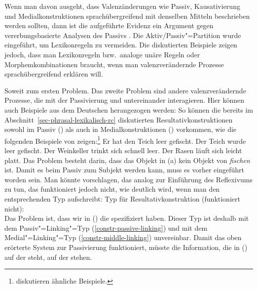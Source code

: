 Wenn man davon ausgeht, dass Valenzänderungen wie Passiv, Kausativierung und Medialkonstruktionen
sprachübergreifend mit denselben Mitteln beschrieben werden sollten, dann ist die aufgeführte
Evidenz ein Argument gegen vererbungsbasierte Analysen des Passivs
\citep{Mueller2006d,Mueller2007d}. Die Aktiv/Passiv"=Partition wurde eingeführt, um Lexikonregeln zu
vermeiden. Die diskutierten Beispiele zeigen jedoch, dass man Lexikonregeln bzw.\ analoge unäre
Regeln oder Morphemkombinationen braucht, wenn man valenzverändernde Prozesse sprachübergreifend
erklären will.

Soweit zum ersten Problem. Das zweite Problem sind andere valenzverändernde Prozesse,
die mit der Passivierung und untereinander interagieren. Hier können auch Beispiele aus dem Deutschen
herangezogen werden: So können \zb die bereits im Abschnitt~\ref{sec-phrasal-lexikalisch-rc} diskutierten
Resultativkonstruktionen sowohl im Passiv () als auch in Medialkonstruktionen ()
vorkommen, wie die folgenden Beispiele von \citet[]{Wunderlich97c} zeigen:\footnote{
        \citet[]{KR95a} diskutieren ähnliche Beispiele.%
}
\eal
\label{bsp-res-passiv-zwei}
\ex Er hat den Teich leer gefischt.
\ex Der Teich wurde leer gefischt.
\zl
\eal
\label{ex-res-nonselected-obj-passive}
\ex{}
Der Weinkeller  trinkt sich schnell leer.
\ex{}
Der Rasen läuft sich leicht platt.
\zl
Das Problem besteht darin, dass das Objekt in (a) kein Objekt von \emph{fischen} ist.
Damit es beim Passiv zum Subjekt werden kann, muss es vorher eingeführt worden sein. Man könnte
vorschlagen, das analog zur Einführung des Reflexivums zu tun, das funktioniert jedoch nicht,
wie deutlich wird, wenn man den entsprechenden Typ aufschreibt:
\ea
Typ für Resultativkonstruktion (funktioniert nicht):\\
\z
Das Problem ist, dass wir in () die \compsl spezifiziert haben. Dieser
Typ ist deshalb mit dem Passiv"=Linking"=Typ (\ref{constr-passive-linking}) und mit dem
Medial"=Linking"=Typ (\ref{constr-middle-linking}) unvereinbar. Damit das oben erörterte System zur Passivierung
funktioniert, müsste die Information, die in () auf der \compsl steht, auf der \argstl stehen.

